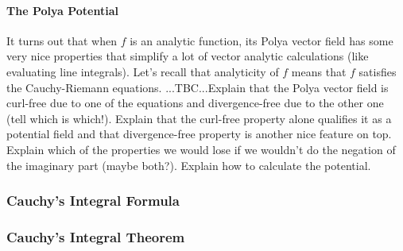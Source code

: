 
\paragraph{The Polya Potential}
It turns out that when $f$ is an analytic function, its Polya vector field has some very nice properties that simplify a lot of vector analytic calculations (like evaluating line integrals). Let's recall that analyticity of $f$ means that $f$ satisfies the Cauchy-Riemann equations. ...TBC...Explain that the Polya vector field is curl-free due to one of the equations and divergence-free due to the other one (tell which is which!). Explain that the curl-free property alone qualifies it as a potential field and that divergence-free property is another nice feature on top. Explain which of the properties we would lose if we wouldn't do the negation of the imaginary part (maybe both?). Explain how to calculate the potential.





\subsubsection{Cauchy's Integral Formula}





\subsubsection{Cauchy's Integral Theorem}




